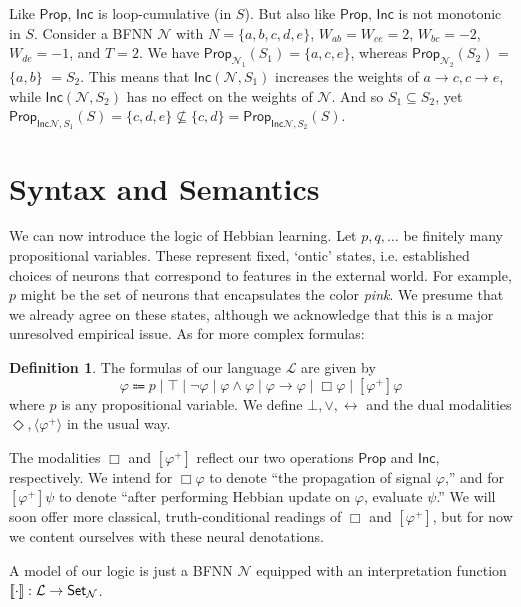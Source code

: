 \documentclass[12pt]{article}
\newcommand{\Set}{\mbox{\sf Set}}
\theoremstyle{definition}
\newtheorem{definition}{Definition}
\newcommand{\semantics}[1]{[\![\mbox{\em $ #1 $\/}]\!]}
\newcommand{\set}[1]{\{ #1 \}}
\newcommand{\lang}{\mathcal{L}}
\newcommand{\Prop}{\textsf{Prop}}
\newcommand{\Inc}{\textsf{Inc}}
\newcommand{\Net}{\mathcal{N}}
\begin{document}
Like $\Prop$, $\Inc$ is loop-cumulative (in $S$).  But also like $\Prop$, $\Inc$ is not monotonic in $S$.  Consider a BFNN $\Net$ with ${N = \set{a, b, c, d, e}}$, ${W_{ab} = W_{ce} = 2}$, ${W_{bc} = -2}$, ${W_{de} = -1}$, and ${T = 2}$.
We have ${\Prop_{\Net_1}(S_1) = \set{a, c, e}}$, whereas $\Prop_{\Net_2}(S_2)$ = $\set{a, b}$ $= {S_2}$.  This means that $\Inc(\Net, S_1)$ increases the weights of ${a \to c}, {c \to e}$, while $\Inc(\Net, S_2)$ has no effect on the weights of $\Net$.  And so ${S_1 \subseteq S_2}$, yet $\Prop_{\Inc{\Net, S_1}}(S) = \set{c, d, e} \not \subseteq \set{c, d} = \Prop_{\Inc{\Net, S_2}}(S)$.

\section{\textcolor{myblue}{Syntax and Semantics}}

We can now introduce the logic of Hebbian learning.  Let $p, q, \ldots$ be finitely many propositional variables.  These represent fixed, `ontic' states, i.e. established choices of neurons that correspond to features in the external world.  For example, $p$ might be the set of neurons that encapsulates the color \emph{pink}.  We presume that we already agree on these states, although we acknowledge that this is a major unresolved empirical issue.  As for more complex formulas:

\begin{definition}  The formulas of our language $\lang$ are given by
\[
\varphi \Coloneqq p \mid \top \mid \neg \varphi \mid \varphi \land \varphi \mid \varphi \to \varphi \mid \Box \varphi \mid [\varphi^+] \varphi
\]
where $p$ is any propositional variable.  We define $\bot, \lor, \leftrightarrow$ and the dual modalities $\Diamond, \langle \varphi^+ \rangle$ in the usual way.
\end{definition}

The modalities $\Box$ and $[\varphi^+]$ reflect our two operations $\Prop$ and $\Inc$, respectively.  We intend for $\Box \varphi$ to denote ``the propagation of signal $\varphi$,'' and for $[\varphi^+] \psi$ to denote ``after performing Hebbian update on $\varphi$, evaluate $\psi$.''  We will soon offer more classical, truth-conditional readings of $\Box$ and $[\varphi^+]$, but for now we content ourselves with these neural denotations.

A model of our logic is just a BFNN $\Net$ equipped with an interpretation function $\semantics{\cdot} : \lang \to \Set_\Net$. 
\end{document}
